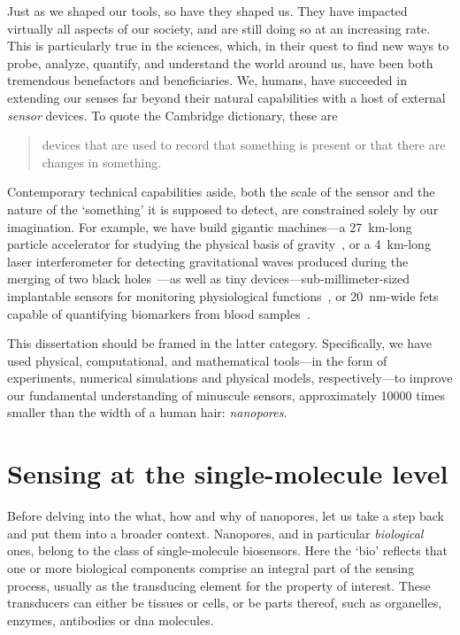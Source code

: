 Just as we shaped our tools, so have they shaped us. They have impacted virtually all aspects of our society,
and are still doing so at an increasing rate. This is particularly true in the sciences, which, in their quest
to find new ways to probe, analyze, quantify, and understand the world around us, have been both tremendous
benefactors and beneficiaries. We, humans, have succeeded in extending our senses far beyond their natural
capabilities with a host of external \emph{sensor} devices. To quote the Cambridge dictionary, these are
%
\begin{quote}
  devices that are used to record that something is present or that there are changes in something.
\end{quote}
%
Contemporary technical capabilities aside, both the scale of the sensor and the nature of the `something' it
is supposed to detect, are constrained solely by our imagination. For example, we have build gigantic
machines---a \SI{27}{\kilo\meter}-long particle accelerator for studying the physical basis of
gravity~\cite{ATLAS-2012}, or a \SI{4}{\kilo\meter}-long laser interferometer for detecting gravitational waves
produced during the merging of two black holes~\cite{Abbott-2016}---as well as tiny
devices---sub-millimeter-sized implantable sensors for monitoring physiological functions~\cite{Dong-2019}, or
\SI{20}{\nm}-wide \glspl{fet} capable of quantifying biomarkers from blood samples~\cite{Krivitsky-2016}.

This dissertation should be framed in the latter category. Specifically, we have used physical, computational,
and mathematical tools---in the form of experiments, numerical simulations and physical models,
respectively---to improve our fundamental understanding of minuscule sensors, approximately \num{10000} times
smaller than the width of a human hair: \emph{nanopores}.


%
%
\section{Sensing at the single-molecule level}
%

Before delving into the what, how and why of nanopores, let us take a step back and put them into a broader
context. Nanopores, and in particular \emph{biological} ones, belong to the class of single-molecule
biosensors. Here the `bio' reflects that one or more biological components comprise an integral part of the
sensing process, usually as the transducing element for the property of interest. These transducers can either
be tissues or cells, or be parts thereof, such as organelles, enzymes, antibodies or \gls{dna} molecules.

